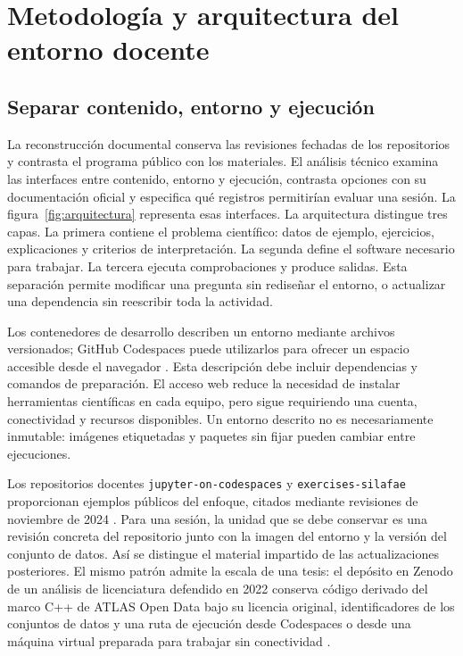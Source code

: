 \section{Metodología y arquitectura del entorno docente}
\subsection{Separar contenido, entorno y ejecución}
La reconstrucción documental conserva las revisiones fechadas de los repositorios y contrasta el programa público con los materiales. El análisis técnico examina las interfaces entre contenido, entorno y ejecución, contrasta opciones con su documentación oficial y especifica qué registros permitirían evaluar una sesión. La figura~\ref{fig:arquitectura} representa esas interfaces. La arquitectura distingue tres capas. La primera contiene el problema científico: datos de ejemplo, ejercicios, explicaciones y criterios de interpretación. La segunda define el software necesario para trabajar. La tercera ejecuta comprobaciones y produce salidas. Esta separación permite modificar una pregunta sin rediseñar el entorno, o actualizar una dependencia sin reescribir toda la actividad.

Los contenedores de desarrollo describen un entorno mediante archivos versionados; GitHub Codespaces puede utilizarlos para ofrecer un espacio accesible desde el navegador \cite{devcontainers}. Esta descripción debe incluir dependencias y comandos de preparación. El acceso web reduce la necesidad de instalar herramientas científicas en cada equipo, pero sigue requiriendo una cuenta, conectividad y recursos disponibles. Un entorno descrito no es necesariamente inmutable: imágenes etiquetadas y paquetes sin fijar pueden cambiar entre ejecuciones.

Los repositorios docentes \texttt{jupyter-on-codespaces} y \texttt{exercises-silafae} proporcionan ejemplos públicos del enfoque, citados mediante revisiones de noviembre de 2024 \cite{repos}. Para una sesión, la unidad que se debe conservar es una revisión concreta del repositorio junto con la imagen del entorno y la versión del conjunto de datos. Así se distingue el material impartido de las actualizaciones posteriores. El mismo patrón admite la escala de una tesis: el depósito en Zenodo de un análisis de licenciatura defendido en 2022 conserva código derivado del marco C++ de ATLAS Open Data bajo su licencia original, identificadores de los conjuntos de datos y una ruta de ejecución desde Codespaces o desde una máquina virtual preparada para trabajar sin conectividad \cite{tesisaltuve}.

